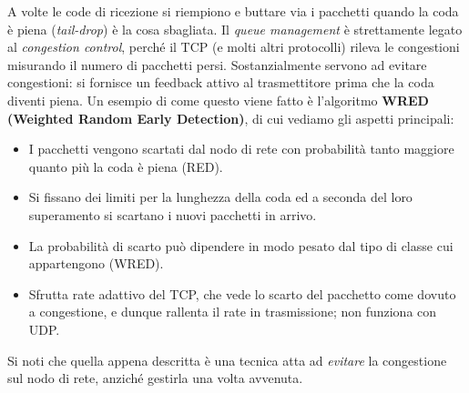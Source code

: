 A volte le code di ricezione si riempiono e buttare via i pacchetti quando la coda è piena (\textit{tail-drop}) è la cosa sbagliata. Il \textit{queue management} è strettamente legato al \textit{congestion control}, perché il TCP (e molti altri protocolli) rileva le congestioni misurando il numero di pacchetti persi. Sostanzialmente servono ad evitare congestioni: si fornisce un feedback attivo al trasmettitore prima che la coda diventi piena. Un esempio di come questo viene fatto è l'algoritmo \textbf{WRED (Weighted Random Early Detection)}, di cui vediamo gli aspetti principali:
\begin{itemize}
	\item I pacchetti vengono scartati dal nodo di rete con probabilità tanto maggiore quanto più la coda è piena (RED).
	\item Si fissano dei limiti per la lunghezza della coda ed a seconda del loro superamento si scartano i nuovi pacchetti in arrivo.
	\item La probabilità di scarto può dipendere in modo pesato dal tipo di classe cui appartengono (WRED).
	\item Sfrutta rate adattivo del TCP, che vede lo scarto del pacchetto come dovuto a congestione, e dunque rallenta il rate in trasmissione; non funziona con UDP.
\end{itemize}
Si noti che quella appena descritta è una tecnica atta ad \textit{evitare} la congestione sul nodo di rete, anziché gestirla una volta avvenuta.

